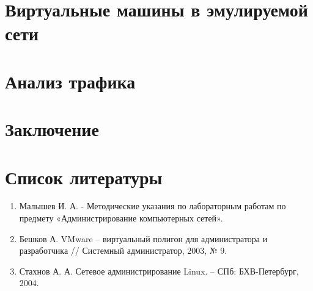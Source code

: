 \documentclass[a4paper, 12pt]{article}		%
\begin{document}

\tableofcontents





%

\newpage
\section{Виртуальные машины в эмулируемой сети}


\newpage
\section{Анализ трафика}


\newpage
\section*{Заключение}




\newpage
\section*{Список литературы}

\begin{enumerate}
\item Малышев И. А. - Методические указания по лабораторным работам по предмету «Администрирование компьютерных сетей».
\item Бешков А. VMware – виртуальный полигон для администратора и разработчика // Системный администратор, 2003, № 9.
\item Стахнов А. А. Сетевое администрирование Linux. – СПб: БХВ-Петербург, 2004.
\end{enumerate}
\end{document}
